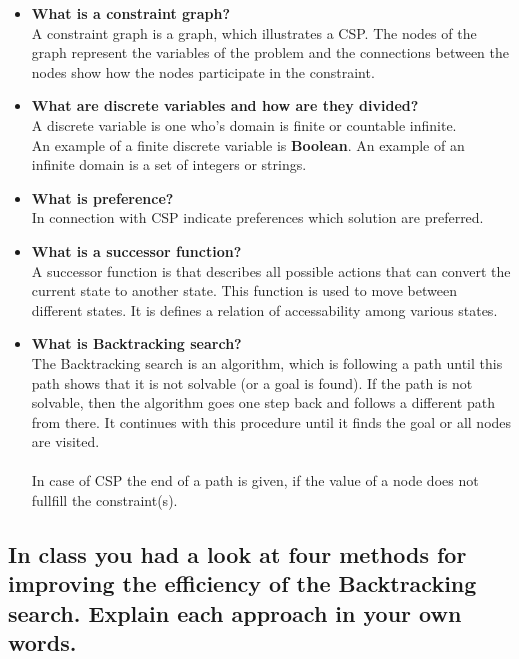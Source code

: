 \documentclass[11pt]{article}
\begin{document}
\begin{itemize}
		
		\item\textbf{What is a constraint graph?}\\
		A constraint graph is a graph, which illustrates a CSP. The nodes of the graph represent the variables of the problem and the connections between the nodes show how the nodes participate in the constraint.
		
		\item\textbf{What are discrete variables and how are they divided?}\\
		A discrete variable is one who's domain is finite or countable infinite.\\ An example of a finite discrete variable is \textbf{Boolean}. An example of an infinite domain is a set of integers or strings.
		
		\item\textbf{What is preference?}\\
		In connection with CSP indicate preferences which solution are preferred. 
		
		\item\textbf{What is a successor function?}\\
		A successor function is that describes all possible actions that can convert the current state to another state. This function is used to move between different states. It is defines a relation of accessability among various states. 
		
		\item\textbf{What is Backtracking search?}\\
		The Backtracking search is an algorithm, which is following a path until this path shows that it is not solvable (or a goal is found). If the path is not solvable, then the algorithm goes one step back and follows a different path from there. It continues with this procedure until it finds the goal or all nodes are visited.\\
		\\
		In case of CSP the end of a path is given, if the value of a node does not fullfill the constraint(s).
	\end{itemize}

\newpage
\subsection{In class you had a look at four methods for improving the efficiency of
the Backtracking search. Explain each approach in your own words.}

\newpage
\end{document}
